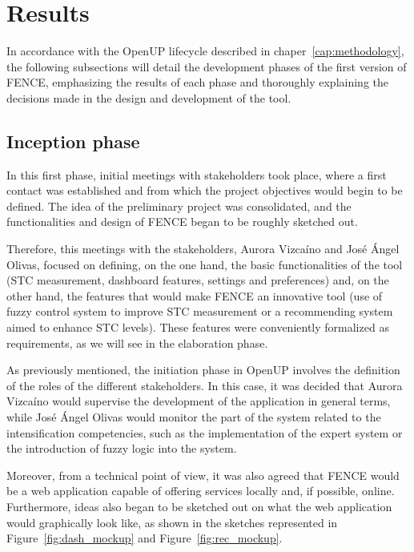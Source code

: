 \chapter{Results}
\label{cap:results}

In accordance with the OpenUP lifecycle described in chaper~\ref{cap:methodology}, the following subsections will detail the development phases of the first version of FENCE, emphasizing the results of each phase and thoroughly explaining the decisions made in the design and development of the tool.

\section{Inception phase}

In this first phase, initial meetings with stakeholders took place, where a first contact was established and from which the project objectives would begin to be defined. The idea of the preliminary project was consolidated, and the functionalities and design of FENCE began to be roughly sketched out.

Therefore, this meetings with the stakeholders, Aurora Vizcaíno and José Ángel Olivas, focused on defining, on the one hand, the basic functionalities of the tool (STC measurement, dashboard features, settings and preferences) and, on the other hand, the features that would make FENCE an innovative tool (use of fuzzy control system to improve STC measurement or a recommending system aimed to enhance STC levels). These features were conveniently formalized as requirements, as we will see in the elaboration phase.

As previously mentioned, the initiation phase in OpenUP involves the definition of the roles of the different stakeholders. In this case, it was decided that Aurora Vizcaíno would supervise the development of the application in general terms, while José Ángel Olivas would monitor the part of the system related to the intensification competencies, such as the implementation of the expert system or the introduction of fuzzy logic into the system.

Moreover, from a technical point of view, it was also agreed that FENCE would be a web application capable of offering services locally and, if possible, online. Furthermore, ideas also began to be sketched out on what the web application would graphically look like, as shown in the sketches represented in Figure~\ref{fig:dash_mockup} and Figure~\ref{fig:rec_mockup}.

